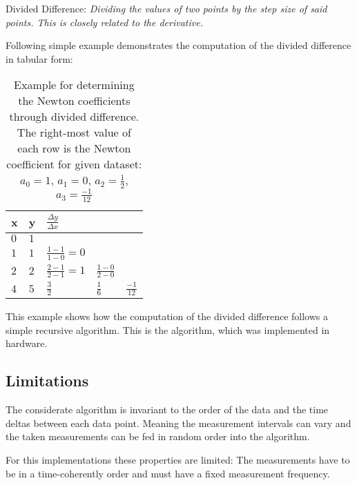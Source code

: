 \begin{defn}
	Divided Difference: \textit{Dividing the values of two points by the
		step size of said points. This is closely related to the
		derivative.}
\end{defn}

Following simple example demonstrates the computation of the divided
difference in tabular form:
\begin{table}[H]
	\centering
	\begin{tabular}{ l | l l l l }
	x	& y	& $\frac{\Delta y}{\Delta x}$	&		& \\ \hline
	$0$	& $1$	&			&			& \\
	$1$	& $1$	& $\frac{1-1}{1-0} = 0$	&			& \\
	$2$	& $2$	& $\frac{2-1}{2-1} = 1$	& $\frac{1-0}{2-0}$	& \\
	$4$	& $5$	& $\frac{3}{2}$		& $\frac{1}{6}$		& $\frac{-1}{12}$ \\
	\end{tabular}
	\caption{Example for determining the Newton coefficients through divided
		difference. The right-most value of each row is the Newton
		coefficient for given dataset: $a_0 = 1$, $a_1 = 0$, $a_2 =
		\frac{1}{2}$, $a_3 = \frac{-1}{12}$}
\end{table}

This example shows how the computation of the divided difference follows a
simple recursive algorithm. This is the algorithm, which was implemented in
hardware.


\subsection{Limitations}
The considerate algorithm is invariant to the order of the data and the time
deltas between each data point. Meaning the measurement intervals can vary and
the taken measurements can be fed in random order into the algorithm.

For this implementations these properties are limited: The measurements have
to be in a time-coherently order and must have a fixed measurement frequency.
